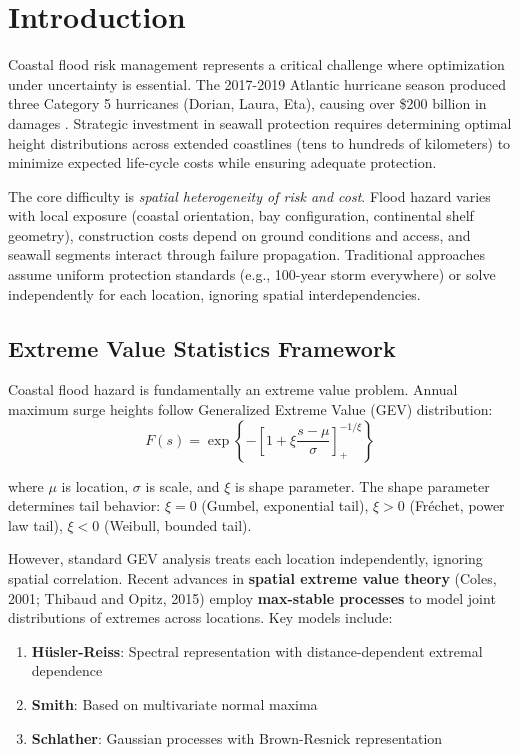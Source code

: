 \documentclass[review]{elsarticle}
\begin{document}
\section{Introduction}

Coastal flood risk management represents a critical challenge where optimization under uncertainty is essential. The 2017-2019 Atlantic hurricane season produced three Category 5 hurricanes (Dorian, Laura, Eta), causing over \$200 billion in damages \cite{blake2020hurricanes}. Strategic investment in seawall protection requires determining optimal height distributions across extended coastlines (tens to hundreds of kilometers) to minimize expected life-cycle costs while ensuring adequate protection.

The core difficulty is \textit{spatial heterogeneity of risk and cost}. Flood hazard varies with local exposure (coastal orientation, bay configuration, continental shelf geometry), construction costs depend on ground conditions and access, and seawall segments interact through failure propagation. Traditional approaches assume uniform protection standards (e.g., 100-year storm everywhere) or solve independently for each location, ignoring spatial interdependencies.

\subsection{Extreme Value Statistics Framework}

Coastal flood hazard is fundamentally an extreme value problem. Annual maximum surge heights follow Generalized Extreme Value (GEV) distribution:
\begin{equation}
F(s) = \exp\left\{-\left[1 + \xi\frac{s-\mu}{\sigma}\right]_+^{-1/\xi}\right\}
\label{eq:gev}
\end{equation}

where $\mu$ is location, $\sigma$ is scale, and $\xi$ is shape parameter. The shape parameter determines tail behavior: $\xi=0$ (Gumbel, exponential tail), $\xi>0$ (Fréchet, power law tail), $\xi<0$ (Weibull, bounded tail).

However, standard GEV analysis treats each location independently, ignoring spatial correlation. Recent advances in \textbf{spatial extreme value theory} (Coles, 2001; Thibaud and Opitz, 2015) employ \textbf{max-stable processes} to model joint distributions of extremes across locations. Key models include:

\begin{enumerate}
\item \textbf{Hüsler-Reiss}: Spectral representation with distance-dependent extremal dependence
\item \textbf{Smith}: Based on multivariate normal maxima
\item \textbf{Schlather}: Gaussian processes with Brown-Resnick representation
\end{enumerate}
\end{document}
